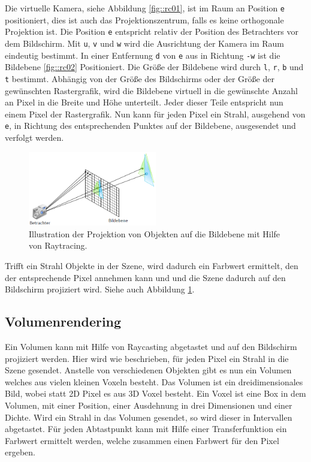 Die virtuelle Kamera, siehe Abbildung \ref{fig::rc01}, ist im Raum an Position \texttt{e} positioniert, dies ist auch das Projektionszentrum, falls es keine orthogonale Projektion ist.
Die Position \texttt{e} entspricht relativ der Position des Betrachters vor dem Bildschirm.
Mit \texttt{u}, \texttt{v} und \texttt{w} wird die Ausrichtung der Kamera im Raum eindeutig bestimmt.
In einer Entfernung \texttt{d} von \texttt{e} aus in Richtung \texttt{-w} ist die Bildebene \ref{fig::rc02} Positioniert.
Die Größe der Bildebene wird durch \texttt{l}, \texttt{r}, \texttt{b} und \texttt{t} bestimmt.
Abhängig von der Größe des Bildschirms oder der Größe der gewünschten Rastergrafik, wird die Bildebene virtuell in die gewünschte Anzahl an Pixel in die Breite und Höhe unterteilt.
Jeder dieser Teile entspricht nun einem Pixel der Rastergrafik.
Nun kann für jeden Pixel ein Strahl, ausgehend von \texttt{e}, in Richtung des entsprechenden Punktes auf der Bildebene, ausgesendet und verfolgt werden.
\begin{figure}
	\centering
	\includegraphics[width=0.5\textwidth]{../../Grafiken/Raytracing.png}
	\caption{Illustration der Projektion von Objekten auf die Bildebene mit Hilfe von Raytracing. \cite{Dr.MichaelKrone2016/2017}}
	\label{fig::rc03}
\end{figure}
Trifft ein Strahl Objekte in der Szene, wird dadurch ein Farbwert ermittelt, den der entsprechende Pixel annehmen kann und und die Szene dadurch auf den Bildschirm projiziert wird.
Siehe auch Abbildung \ref{fig::rc03}.

\subsection{Volumenrendering}
Ein Volumen kann mit Hilfe von Raycasting abgetastet und auf den Bildschirm projiziert werden.
Hier wird wie beschrieben, für jeden Pixel ein Strahl in die Szene gesendet.
Anstelle von verschiedenen Objekten gibt es nun ein Volumen welches aus vielen kleinen Voxeln besteht.
Das Volumen ist ein dreidimensionales Bild, wobei statt 2D Pixel es aus 3D Voxel besteht.
Ein Voxel ist eine Box in dem Volumen, mit einer Position, einer Ausdehnung in drei Dimensionen und einer Dichte.
Wird ein Strahl in das Volumen gesendet, so wird dieser in Intervallen abgetastet.
Für jeden Abtastpunkt kann mit Hilfe einer Transferfunktion ein Farbwert ermittelt werden, welche zusammen einen Farbwert für den Pixel ergeben.


